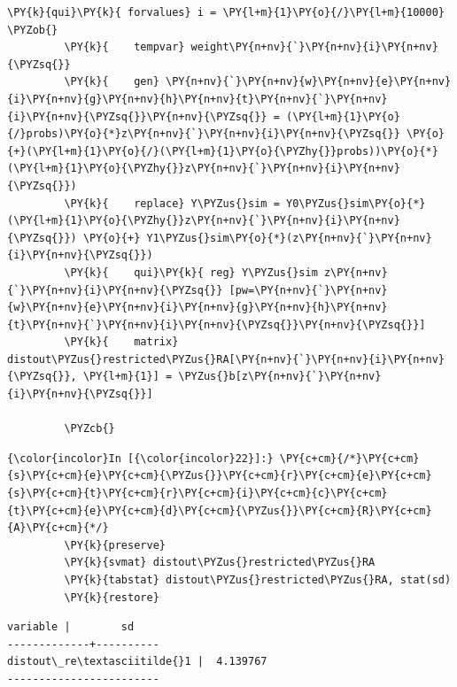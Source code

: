 \documentclass[11pt,notitlepage]{article}\usepackage[]{graphicx}\usepackage[]{color}
\makeatletter
\newenvironment{kframe}{%
 \def\at@end@of@kframe{}%
 \ifinner\ifhmode%
  \def\at@end@of@kframe{\end{minipage}}%
  \begin{minipage}{\columnwidth}%
 \fi\fi%
 \def\FrameCommand##1{\hskip\@totalleftmargin \hskip-\fboxsep
 \colorbox{shadecolor}{##1}\hskip-\fboxsep
     \hskip-\linewidth \hskip-\@totalleftmargin \hskip\columnwidth}%
 \MakeFramed {\advance\hsize-\width
   \@totalleftmargin\z@ \linewidth\hsize
   \@setminipage}}%
 {\par\unskip\endMakeFramed%
 \at@end@of@kframe}
\newenvironment{knitrout}{}{} %
\makeatother
\begin{document}
\begin{enumerate}[a)]
\begin{knitrout}
\begin{kframe}
\begin{Verbatim}[commandchars=\\\{\}]
         \PY{k}{qui}\PY{k}{ forvalues} i = \PY{l+m}{1}\PY{o}{/}\PY{l+m}{10000} \PYZob{}
         \PY{k}{	tempvar} weight\PY{n+nv}{`}\PY{n+nv}{i}\PY{n+nv}{\PYZsq{}}
         \PY{k}{	gen} \PY{n+nv}{`}\PY{n+nv}{w}\PY{n+nv}{e}\PY{n+nv}{i}\PY{n+nv}{g}\PY{n+nv}{h}\PY{n+nv}{t}\PY{n+nv}{`}\PY{n+nv}{i}\PY{n+nv}{\PYZsq{}}\PY{n+nv}{\PYZsq{}} = (\PY{l+m}{1}\PY{o}{/}probs)\PY{o}{*}z\PY{n+nv}{`}\PY{n+nv}{i}\PY{n+nv}{\PYZsq{}} \PY{o}{+}(\PY{l+m}{1}\PY{o}{/}(\PY{l+m}{1}\PY{o}{\PYZhy{}}probs))\PY{o}{*}(\PY{l+m}{1}\PY{o}{\PYZhy{}}z\PY{n+nv}{`}\PY{n+nv}{i}\PY{n+nv}{\PYZsq{}})
         \PY{k}{	replace} Y\PYZus{}sim = Y0\PYZus{}sim\PY{o}{*}(\PY{l+m}{1}\PY{o}{\PYZhy{}}z\PY{n+nv}{`}\PY{n+nv}{i}\PY{n+nv}{\PYZsq{}}) \PY{o}{+} Y1\PYZus{}sim\PY{o}{*}(z\PY{n+nv}{`}\PY{n+nv}{i}\PY{n+nv}{\PYZsq{}})
         \PY{k}{	qui}\PY{k}{ reg} Y\PYZus{}sim z\PY{n+nv}{`}\PY{n+nv}{i}\PY{n+nv}{\PYZsq{}} [pw=\PY{n+nv}{`}\PY{n+nv}{w}\PY{n+nv}{e}\PY{n+nv}{i}\PY{n+nv}{g}\PY{n+nv}{h}\PY{n+nv}{t}\PY{n+nv}{`}\PY{n+nv}{i}\PY{n+nv}{\PYZsq{}}\PY{n+nv}{\PYZsq{}}]
         \PY{k}{	matrix} distout\PYZus{}restricted\PYZus{}RA[\PY{n+nv}{`}\PY{n+nv}{i}\PY{n+nv}{\PYZsq{}}, \PY{l+m}{1}] = \PYZus{}b[z\PY{n+nv}{`}\PY{n+nv}{i}\PY{n+nv}{\PYZsq{}}]
         
         \PYZcb{}
\end{Verbatim}

    \begin{Verbatim}[commandchars=\\\{\}]
{\color{incolor}In [{\color{incolor}22}]:} \PY{c+cm}{/*}\PY{c+cm}{s}\PY{c+cm}{e}\PY{c+cm}{\PYZus{}}\PY{c+cm}{r}\PY{c+cm}{e}\PY{c+cm}{s}\PY{c+cm}{t}\PY{c+cm}{r}\PY{c+cm}{i}\PY{c+cm}{c}\PY{c+cm}{t}\PY{c+cm}{e}\PY{c+cm}{d}\PY{c+cm}{\PYZus{}}\PY{c+cm}{R}\PY{c+cm}{A}\PY{c+cm}{*/}
         \PY{k}{preserve}
         \PY{k}{svmat} distout\PYZus{}restricted\PYZus{}RA
         \PY{k}{tabstat} distout\PYZus{}restricted\PYZus{}RA, stat(sd)
         \PY{k}{restore}
\end{Verbatim}

    \begin{Verbatim}[commandchars=\\\{\}]
    variable |        sd
-------------+----------
distout\_re\textasciitilde{}1 |  4.139767
------------------------
    \end{Verbatim}


\end{kframe}
\end{knitrout}
\end{enumerate}
\end{document}
